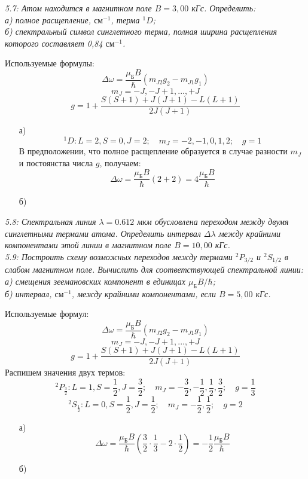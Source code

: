     \emph{5.7: Атом находится в магнитном поле \( B = 3,00 \) кГс. 
        Определить:\\
        а) полное расщепление, \( \text{см}^{-1} \), терма \( ^1D \);\\
        б) спектральный символ синглетного терма, полная ширина расщепления 
        которого составляет 0,84 \( \text{см}^{-1} \).}

        Используемые формулы: 
		\[ 
            \Delta\omega = \frac{\mu_\text{Б}B}{\hbar}(m_{J2}g_{2}-m_{J1}
            g_{1}) 
        \]
		\[ m_J = -J, -J+1, ..., +J \]
		\[ g = 1 + \frac{S(S+1)+J(J+1)-L(L+1)}{2J(J+1)} \]
		\begin{itemize}\itemsep-8pt
			\item[а)] 
			\[ 
				^1D: L=2, S=0, J=2;\quad
				m_J = -2, -1, 0, 1, 2;\quad
				g = 1
			\]
			В предположении, что полное расщепление образуется в случае разности
			\( m_J \) и постоянства числа \( g \), получаем:
			\[ 
				\Delta\omega = \frac{\mu_\text{Б}B}{\hbar}(2+2) 
				= 4\frac{\mu_\text{Б}B}{\hbar} 
			\]
			\item[б)]
		\end{itemize}

    \emph{5.8: Спектральная линия \( \lambda = 0.612 \) мкм обусловлена переходом
        между двумя синглетными термами атома. Определить интервал \( \Delta\lambda \)
        между крайними компонентами этой линии в магнитном поле 
        \( B = 10,00 \) кГс.}\\

	\emph{5.9: Построить схему возможных переходов между термами \( ^2P_{3/2} \) 
        и \( ^2S_{1/2} \) в слабом магнитном поле. Вычислить для соответствующей 
        спектральной линии: \\
        а) смещения зеемановских компонент в единицах 
        \( \mu_\text{Б}B/\hbar \);\\
        б) интервал, \( \text{см}^{-1} \), между крайними компонентами, если \( B = 5,00 \) кГс.} 

        Используемые формул:
		\[ \Delta\omega = \frac{\mu_\text{Б}B}{\hbar}(m_{J2}g_{2}-m_{J1}g_{1}) \]
		\[ m_J = -J, -J+1, ..., +J \]
		\[ g = 1 + \frac{S(S+1)+J(J+1)-L(L+1)}{2J(J+1)} \]
		Распишем значения двух термов:
		\[ 
			^2P_\frac{3}{2}: L = 1, S = \frac{1}{2}, J = \frac{3}{2};\quad
			m_J = -\frac{3}{2}, -\frac{1}{2}, \frac{1}{2}, \frac{3}{2};\quad
			g = \frac{1}{3}
		\]
		\[ 
			^2S_\frac{1}{2}: L = 0, S = \frac{1}{2}, J = \frac{1}{2};\quad
			m_J = -\frac{1}{2}, \frac{1}{2};\quad
			g = 2
		\]
		\begin{itemize}\itemsep-8pt
			\item[а)]
			\[ 
				\Delta\omega = \frac{\mu_\text{Б}B}{\hbar}
				(\frac{3}{2}\cdot\frac{1}{3} - 2\cdot\frac{1}{2}) = 
				-\frac{1}{2}\frac{\mu_\text{Б}B}{\hbar}
			\]
			\item[б)]
		\end{itemize}

